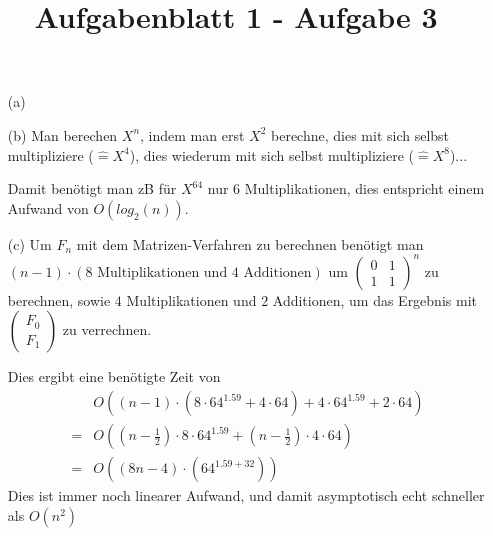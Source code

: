 \documentclass{article}
\title{Aufgabenblatt 1 - Aufgabe 3}
\begin{document}
\maketitle

\begin{enumerate}
\item[(a)]

\item[(b)]
Man berechen $X^n$, indem man erst $X^2$ berechne, dies mit sich 
selbst multipliziere ($\widehat{=} X^4$), dies wiederum mit sich 
selbst multipliziere ($\widehat{=} X^8$)... 

Damit benötigt man zB für $X^{64}$ nur 6 Multiplikationen, 
dies entspricht einem Aufwand von $O(log_2(n))$.

\item[(c)]
Um $F_n$ mit dem Matrizen-Verfahren zu berechnen benötigt man 
$(n-1) \cdot (8 \text{ Multiplikationen und } 4 \text{ Additionen})$ 
um $\begin{pmatrix} 0 & 1 \\ 1 & 1 \end{pmatrix}^n$ zu berechnen, 
sowie $4$ Multiplikationen und $2$ Additionen, um das Ergebnis mit 
$\begin{pmatrix} F_0 \\ F_1 \end{pmatrix}$ zu verrechnen. 

Dies ergibt eine benötigte Zeit von 
\begin{align*}
&O((n-1) \cdot (8 \cdot 
64^{1.59} + 4 \cdot 64)+ 4 \cdot 64^{1.59} + 2 \cdot 64) \\ = 
&O((n-\frac{1}{2}) \cdot 8 \cdot 64^{1.59} + (n-\frac{1}{2})\cdot 4 \cdot 64) \\ 
= &O((8n-4)\cdot (64^{1.59 + 32}))
\end{align*}  
Dies ist immer noch linearer Aufwand, und damit asymptotisch 
echt schneller als $O(n^2)$
\end{enumerate}
\end{document}
